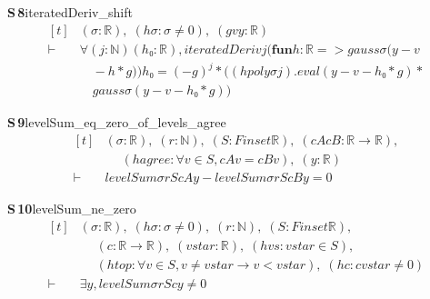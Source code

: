 \documentclass[conference]{IEEEtran}
\theoremstyle{definition}
\newcommand{\lean}[1]{\textsf{\footnotesize #1}}
\begin{document}
\noindent\textbf{S\,8}\quad\lean{iteratedDeriv\_shift}
{\footnotesize\[ \begin{aligned}[t]
&(\sigma : \mathbb{R} ),\; (\mathit{hσ} : \sigma \neq 0),\; (\mathit{g} \mathit{v} \mathit{y} : \mathbb{R} )\\
\vdash\;&\forall (\mathit{j} : \mathbb{N} ) (\mathit{h₀} : \mathbb{R} ), \mathit{iteratedDeriv} \mathit{j} (\mathbf{fun} \mathit{h} : \mathbb{R} => \mathit{gauss} \sigma (\mathit{y} - \mathit{v}\\
&\quad - \mathit{h} * \mathit{g})) \mathit{h₀} = (-\mathit{g}) ^{\mathit{j}} * ((\mathit{hpoly} \sigma \mathit{j}).\mathit{eval} (\mathit{y} - \mathit{v} - \mathit{h₀} * \mathit{g}) *\\
&\quad \mathit{gauss} \sigma (\mathit{y} - \mathit{v} - \mathit{h₀} * \mathit{g}))
\end{aligned} \]}

\noindent\textbf{S\,9}\quad\lean{levelSum\_eq\_zero\_of\_levels\_agree}
{\footnotesize\[ \begin{aligned}[t]
&(\sigma : \mathbb{R} ),\; (\mathit{r} : \mathbb{N} ),\; (\mathit{S} : \mathit{Finset} \mathbb{R} ),\; (\mathit{cA} \mathit{cB} : \mathbb{R} \to \mathbb{R} ),\\
&\quad \; (\mathit{hagree} : \forall \mathit{v} \in \mathit{S}, \mathit{cA} \mathit{v} = \mathit{cB} \mathit{v}),\; (\mathit{y} : \mathbb{R} )\\
\vdash\;&\mathit{levelSum} \sigma \mathit{r} \mathit{S} \mathit{cA} \mathit{y} - \mathit{levelSum} \sigma \mathit{r} \mathit{S} \mathit{cB} \mathit{y} = 0
\end{aligned} \]}

\noindent\textbf{S\,10}\quad\lean{levelSum\_ne\_zero}
{\footnotesize\[ \begin{aligned}[t]
&(\sigma : \mathbb{R} ),\; (\mathit{hσ} : \sigma \neq 0),\; (\mathit{r} : \mathbb{N} ),\; (\mathit{S} : \mathit{Finset} \mathbb{R} ),\\
&\quad \; (\mathit{c} : \mathbb{R} \to \mathbb{R} ),\; (\mathit{vstar} : \mathbb{R} ),\; (\mathit{hvs} : \mathit{vstar} \in \mathit{S}),\\
&\quad \; (\mathit{htop} : \forall \mathit{v} \in \mathit{S}, \mathit{v} \neq \mathit{vstar} \to \mathit{v} < \mathit{vstar}),\; (\mathit{hc} : \mathit{c} \mathit{vstar} \neq 0)\\
\vdash\;&\exists \mathit{y}, \mathit{levelSum} \sigma \mathit{r} \mathit{S} \mathit{c} \mathit{y} \neq 0
\end{aligned} \]}
\end{document}
